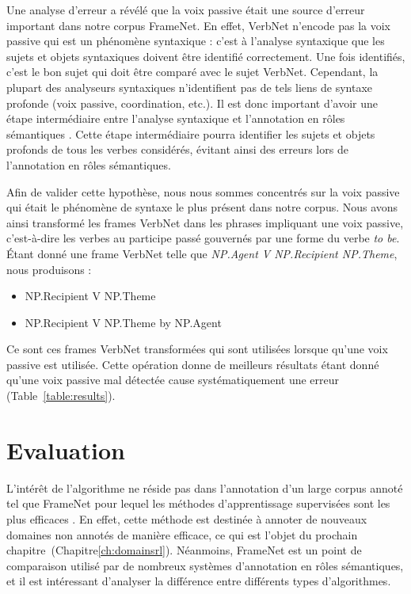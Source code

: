 Une analyse d'erreur a révélé que la voix passive était une source d'erreur
important dans notre corpus FrameNet. En effet, VerbNet n'encode pas la voix
passive qui est un phénomène syntaxique : c'est à l'analyse syntaxique que les
sujets et objets syntaxiques doivent être identifié correctement. Une fois
identifiés, c'est le bon sujet qui doit être comparé avec le sujet VerbNet.
Cependant, la plupart des analyseurs syntaxiques n'identifient pas de tels
liens de syntaxe profonde (voix passive, coordination, etc.). Il est donc
important d'avoir une étape intermédiaire entre l'analyse syntaxique et
l'annotation en rôles sémantiques \citep{bonfante2011modular,
ribeyre2013systeme}. Cette étape intermédiaire pourra identifier les sujets et
objets profonds de tous les verbes considérés, évitant ainsi des erreurs lors
de l'annotation en rôles sémantiques. 

Afin de valider cette hypothèse, nous nous sommes concentrés sur la voix
passive qui était le phénomène de syntaxe le plus présent dans notre corpus.
Nous avons ainsi transformé les frames VerbNet dans les phrases impliquant une
voix passive, c'est-à-dire les verbes au participe passé gouvernés par une
forme du verbe \emph{to be}. Étant donné une frame VerbNet telle que
\textit{NP.Agent V NP.Recipient NP.Theme}, nous produisons :

\begin{itemize}
    \item NP.Recipient V NP.Theme
    \item NP.Recipient V NP.Theme by NP.Agent
\end{itemize}

Ce sont ces frames VerbNet transformées qui sont utilisées lorsque qu'une voix
passive est utilisée. Cette opération donne de meilleurs résultats étant donné
qu'une voix passive mal détectée cause systématiquement une erreur
(Table~\ref{table:results}).

\section{Evaluation}
\label{srl:evaluation}

L'intérêt de l'algorithme ne réside pas dans l'annotation d'un large corpus
annoté tel que FrameNet pour lequel les méthodes d'apprentissage supervisées
sont les plus efficaces \citep{das2014frame}. En effet, cette méthode est
destinée à annoter de nouveaux domaines non annotés de manière efficace, ce qui
est l'objet du prochain chapitre~(Chapitre\ref{ch:domainsrl}). Néanmoins,
FrameNet est un point de comparaison utilisé par de nombreux systèmes
d'annotation en rôles sémantiques, et il est intéressant d'analyser la
différence entre différents types d'algorithmes.

